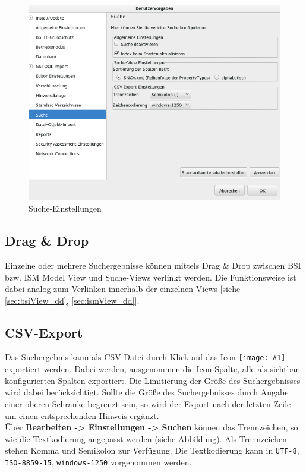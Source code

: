 \documentclass[a4paper,10pt]{book}
\newcommand{\icon}[1]{\texttt{[image: \#1]}}
\begin{document}
\begin{figure}[h]
  \centering
  \includegraphics[width=.9\textwidth]{Screenshot/search-settings.png}
  \caption{Suche-Einstellungen}
  \label{fig:search-settings}
\end{figure}

\subsection{Drag \& Drop}
Einzelne oder mehrere Suchergebnisse können mittels Drag \& Drop zwischen
BSI bzw. ISM Model View und Suche-Views verlinkt werden. Die
Funktionsweise ist dabei analog zum Verlinken innerhalb der einzelnen Views
[siehe \ref{sec:bsiView_dd}, \ref{sec:ismView_dd}].

\subsection{CSV-Export}
\label{sec:csv-export}

Das Suchergebnis kann als CSV-Datei durch Klick auf das
Icon \icon{Icon/Export.png} exportiert
werden. Dabei werden, ausgenommen die Icon-Spalte, alle als sichtbar
konfigurierten Spalten exportiert.  Die Limitierung der Größe des
Suchergebnisses wird dabei berücksichtigt. Sollte die Größe des
Suchergebnisses durch Angabe einer oberen Schranke begrenzt sein, so
wird der Export nach der letzten Zeile um einen entsprechenden Hinweis
ergänzt.\\

Über \textbf{Bearbeiten -> Einstellungen -> Suchen} können das
Trennzeichen, so wie die Textkodierung angepasst werden (siehe
Abbildung). Als Trennzeichen stehen Komma und Semikolon zur
Verfügung. Die Textkodierung kann in \texttt{UTF-8},
\texttt{ISO-8859-15}, \texttt{windows-1250} vorgenommen werden.
\end{document}
